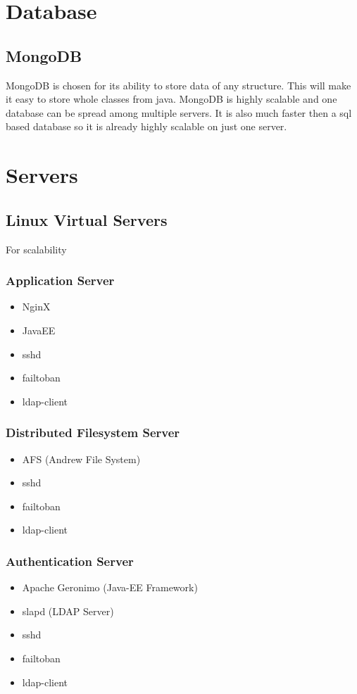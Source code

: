 
\section{Database}
	\subsection{MongoDB}
		MongoDB is chosen for its ability to store data of any structure. This will make it easy to store whole classes from java. MongoDB is highly scalable and one database can be spread among multiple servers. It is also much faster then a sql based database so it is already highly scalable on just one server. 
\section{Servers}
	\subsection{Linux Virtual Servers}
		For scalability
		\subsubsection{Application Server}
		\begin{itemize}
			\item NginX
			\item JavaEE
			\item sshd
			\item failtoban
			\item ldap-client
		\end{itemize}
		\subsubsection{Distributed Filesystem Server}
		\begin{itemize}
			\item AFS (Andrew File System)
			\item sshd
			\item failtoban
			\item ldap-client
		\end{itemize}
		\subsubsection{Authentication Server}
		\begin{itemize}
			\item Apache Geronimo (Java-EE Framework)
			\item slapd (LDAP Server)
			\item sshd
			\item failtoban
			\item ldap-client
		\end{itemize}		
